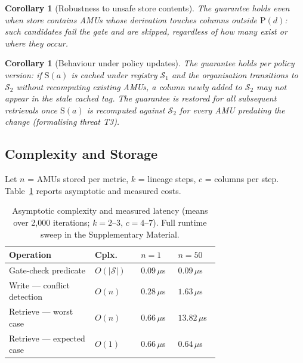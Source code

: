 \documentclass[nolineno]{ieeeaccess}
\newtheorem{corollary}[theorem]{Corollary}
\begin{document}
\begin{corollary}[Robustness to unsafe store contents]
\label{cor:unsafe-contents}
The guarantee holds even when \textit{store} contains AMUs whose derivation
touches columns outside $\mathrm{P}(d)$: such candidates fail the gate and
are skipped, regardless of how many exist or where they occur.
\end{corollary}

\begin{corollary}[Behaviour under policy updates]
\label{cor:policy-update}
The guarantee holds \emph{per policy version}: if $\mathrm{S}(a)$ is cached
under registry $\mathcal{S}_1$ and the organisation transitions to
$\mathcal{S}_2$ without recomputing existing AMUs, a column newly added to
$\mathcal{S}_2$ may not appear in the stale cached tag. The guarantee is
restored for all subsequent retrievals once $\mathrm{S}(a)$ is recomputed
against $\mathcal{S}_2$ for every AMU predating the change (formalising
threat T3).
\end{corollary}

\subsection{Complexity and Storage}
\label{sec:complexity}

Let $n$ = AMUs stored per metric, $k$ = lineage steps, $c$ = columns per
step.
Table~\ref{tab:complexity} reports asymptotic and measured costs.

\begin{table}[t]
\centering
\caption{Asymptotic complexity and measured latency (means over 2{,}000
iterations; $k{=}2$--$3$, $c{=}4$--$7$). Full runtime sweep in the
Supplementary Material.}
\label{tab:complexity}
\footnotesize
\begin{tabular}{@{}p{0.32\linewidth}p{0.12\linewidth}p{0.13\linewidth}p{0.13\linewidth}@{}}
\toprule
\textbf{Operation} & \textbf{Cplx.} & \textbf{$n{=}1$} & \textbf{$n{=}50$} \\
\midrule
Gate-check predicate        & $O(|\mathcal{S}|)$ & $0.09\,\mu$s & $0.09\,\mu$s \\
Write --- conflict detection & $O(n)$  & $0.28\,\mu$s & $1.63\,\mu$s \\
Retrieve --- worst case      & $O(n)$  & $0.66\,\mu$s & $13.82\,\mu$s \\
Retrieve --- expected case   & $O(1)$  & $0.66\,\mu$s & $0.64\,\mu$s \\
\bottomrule
\end{tabular}
\end{table}
\end{document}
